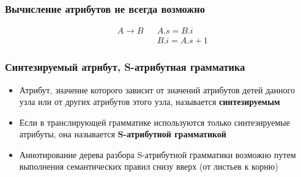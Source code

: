 \documentclass{beamer}
\begin{document}
\begin{frame}[fragile]
  \transwipe[direction=90]
  \frametitle{Вычисление атрибутов не всегда возможно}
$$
\begin{array}{clcl}
&A \rightarrow    B   & & A.s = B.i \\
&                     & & B.i = A.s + 1 
\end{array}
$$  
\end{frame}


\begin{frame}[fragile]
  \transwipe[direction=90]
  \frametitle{Синтезируемый атрибут, S-атрибутная грамматика}
  \begin{itemize}
    \item Атрибут, значение которого зависит от значений атрибутов детей данного узла или от других атрибутов этого узла, называется \textbf{синтезируемым}
    \item Если в транслирующей грамматике используются только синтезируемые атрибуты, она называется \textbf{S-атрибутной грамматикой}
    \item Аннотирование дерева разбора S-атрибутной грамматики возможно путем выполнения семантических правил снизу вверх (от листьев к корню)
  \end{itemize}    
  
\end{frame}
\end{document}
